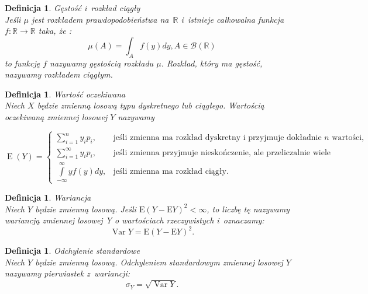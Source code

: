 \documentclass[12pt,a4paper]{report}
\newtheorem{definition}[theorem]{Definicja}
\newcommand{\Ex}{\operatorname{E}}
\newcommand{\Variance}{\operatorname{Var}}
\begin{document}
\begin{definition}{Gęstość i~rozkład ciągły \cite[Rozdział 5.1]{jakubowski2004}}\\
Jeśli $\mu$ jest rozkładem prawdopodobieństwa na~$\mathbb{R}$ i~istnieje całkowalna funkcja $f: \mathbb{R} \rightarrow \mathbb{R}$ taka, że :
$$\mu(A)=\int_A f(y)dy,   A\in \mathcal{B}(\mathbb{R})  $$  %
to funkcję $f$ nazywamy gęstością rozkładu $\mu$. Rozkład, który ma gęstość, nazywamy rozkładem ciągłym. 
\end{definition}



\begin{definition}{Wartość oczekiwana \cite[Rozdział 2.6]{krysicki1999}}\\
Niech $X$ będzie zmienną losową typu dyskretnego lub ciągłego. Wartością oczekiwaną zmiennej losowej $Y$ nazywamy 

$$
\Ex (Y)=\left\{ \begin{array}{ll}
\sum\limits_{i=1}^{n} {y_ip_i}, & \textrm{jeśli zmienna ma rozkład dyskretny i~przyjmuje dokładnie $n$ wartości, }\\ 
\sum\limits_{i=1}^{\infty} {y_ip_i}, & \textrm{jeśli zmienna przyjmuje nieskończenie, ale przeliczalnie wiele wartości,}\\
\int\limits_{-\infty}^{\infty} {yf(y)dy}, & \textrm{jeśli zmienna ma rozkład ciągły.}
\end{array} \right.
$$

\end{definition}


\begin{definition}{Wariancja \cite[Rozdział 5.6]{jakubowski2004}}\\
Niech $Y$ będzie zmienną losową. Jeśli $\mathrm{E}(Y-\mathrm{E}Y)^2 < \infty$, to liczbę tę nazywamy wariancją zmiennej losowej Y o wartościach rzeczywistych i~oznaczamy: 
$$\Variance Y= \mathrm{E}(Y-\mathrm{E}Y)^2.$$
\end{definition}


\begin{definition}{Odchylenie standardowe \cite[Rozdział 5.6]{jakubowski2004}}\\
Niech $Y$ będzie zmienną losową. Odchyleniem standardowym zmiennej losowej $Y$ nazywamy pierwiastek z~wariancji:
$$\sigma_Y=\sqrt{\Variance Y}.$$

\end{definition}
\end{document}
